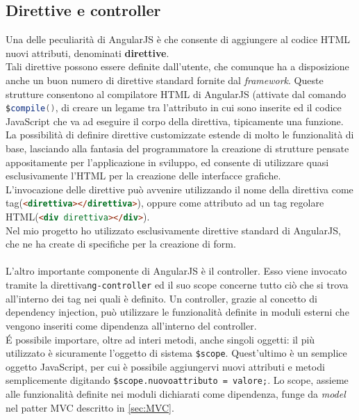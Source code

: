 \subsection{Direttive e controller}
Una delle peculiarità di  AngularJS è che consente di aggiungere al codice HTML nuovi attributi, denominati \textbf{direttive}.\\
Tali direttive possono essere definite dall'utente, che comunque ha a disposizione anche un buon numero di 
direttive standard fornite dal \emph{framework}. Queste strutture consentono al compilatore HTML di AngularJS (attivate dal comando \lstinline[language=Java]!$compile()!, di creare un legame tra l'attributo in cui sono inserite ed il codice JavaScript che va ad eseguire il corpo della direttiva, tipicamente una funzione.\\
La possibilità di definire direttive customizzate estende di molto le funzionalità di base, lasciando alla fantasia del programmatore la creazione di strutture pensate appositamente per l'applicazione in sviluppo, ed consente di utilizzare quasi esclusivamente l'HTML per la creazione delle interfacce grafiche.\\
L'invocazione delle direttive può avvenire utilizzando il nome della direttiva come tag(\lstinline[language=HTML]!<direttiva></direttiva>!), oppure come attributo ad un tag regolare HTML(\lstinline[language=HTML]!<div direttiva></div>!).\\
Nel mio progetto ho utilizzato esclusivamente direttive standard di AngularJS, che ne ha create di specifiche per la creazione di form.\\
\\
L'altro importante componente di AngularJS è il controller. Esso viene invocato tramite la direttiva\lstinline[language=HTML]!ng-controller! ed il suo scope concerne tutto ciò che si trova all'interno dei tag nei quali è definito. Un controller, grazie al concetto di dependency injection, può utilizzare le funzionalità definite in moduli esterni che vengono inseriti come dipendenza all'interno del controller.\\ \'E possibile importare, oltre ad interi metodi, anche singoli oggetti: il più utilizzato è sicuramente l'oggetto di sistema  \lstinline[language=HTML]!$scope!. Quest'ultimo è un semplice oggetto JavaScript, per cui è possibile aggiungervi nuovi attributi e metodi semplicemente digitando \lstinline[language=HTML]!$scope.nuovoattributo = valore;!. Lo scope, assieme alle funzionalità definite nei moduli dichiarati come dipendenza, funge da \emph{model} nel patter MVC descritto in \ref{sec:MVC}.\\
